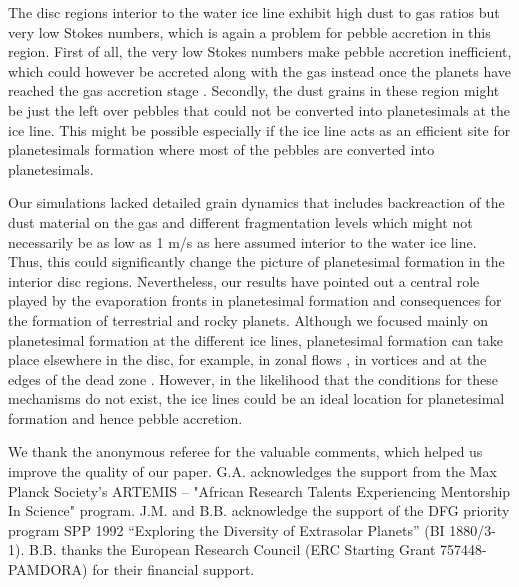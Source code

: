 \documentclass{aa}
\begin{document}
The disc regions interior to the water ice line exhibit high dust to gas ratios but very low Stokes numbers, which is again a problem for pebble accretion in this region. First of all, the very low Stokes numbers make pebble accretion inefficient, which could however be accreted along with the gas instead once the planets have reached the gas accretion stage \citep{Morbidelli2023, BitschMah2023}. Secondly, the dust grains in these region might be just the left over pebbles that could not be converted into planetesimals at the ice line. This might be possible especially if the ice line acts as an efficient site for planetesimals formation where most of the pebbles are converted into planetesimals. 

Our simulations lacked detailed grain dynamics that includes backreaction of the dust material on the gas and different fragmentation levels which might not necessarily be as low as 1 m/s as here assumed interior to the water ice line. Thus, this could significantly change the picture of planetesimal formation in the interior disc regions. Nevertheless, our results have pointed out a central role played by the evaporation fronts in planetesimal formation and consequences for the formation of terrestrial and rocky planets.
Although we focused mainly on planetesimal formation at the different ice lines,  planetesimal formation can take place elsewhere in the disc, for example, in zonal flows \citep{Johansen2011, Dittrich2013}, in vortices \citep{Raettig2015, Surville2016} and at the edges of the dead zone \citep{Lyra2009}. However, in the likelihood that the conditions for these mechanisms do not exist, the ice lines could be an ideal location for planetesimal formation and hence pebble accretion.


\begin{acknowledgements}
We thank the anonymous referee for the valuable comments, which helped us improve the quality of our paper.
G.A. acknowledges the support from the Max Planck Society's ARTEMIS -- "African Research Talents Experiencing Mentorship In Science" program.
J.M. and B.B. acknowledge the support of the DFG priority program SPP 1992 ``Exploring the Diversity of Extrasolar Planets'' (BI 1880/3-1). B.B. thanks the European Research Council (ERC Starting Grant 757448-PAMDORA) for their financial support.
\end{acknowledgements}

    
    
\end{document}
